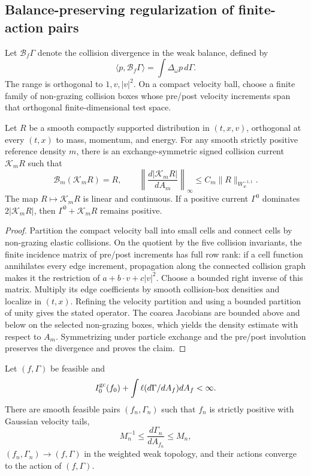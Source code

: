 \subsection{Balance-preserving regularization of finite-action pairs}

Let \(\mathscr B_f\Gamma\) denote the collision divergence in the weak
balance, defined by
\[
 \langle p,\mathscr B_f\Gamma\rangle
 =\int\Delta_\omega p\,d\Gamma.
\]
The range is orthogonal to \(1,v,|v|^2\).  On a compact velocity ball, choose
a finite family of non-grazing collision boxes whose pre/post velocity
increments span that orthogonal finite-dimensional test space.

\begin{lemma}
\label{lem:r3-b2-right-inverse}
Let \(R\) be a smooth compactly supported distribution in
\((t,x,v)\), orthogonal at every \((t,x)\) to mass, momentum, and energy.  For
any smooth strictly positive reference density \(m\), there is an
exchange-symmetric signed collision current \(\mathscr K_mR\) such that
\[
 \mathscr B_m(\mathscr K_mR)=R,
 \qquad
 \left\|\frac{d|\mathscr K_mR|}{dA_m}\right\|_\infty
 \le C_m\|R\|_{W^{-1,1}_w}.
\]
The map \(R\mapsto\mathscr K_mR\) is linear and continuous.  If a positive
current \(\Gamma^0\) dominates
\(2|\mathscr K_mR|\), then
\(\Gamma^0+\mathscr K_mR\) remains positive.
\end{lemma}

\begin{proof}
Partition the compact velocity ball into small cells and connect cells by
non-grazing elastic collisions.  On the quotient by the five collision
invariants, the finite incidence matrix of pre/post increments has full row
rank: if a cell function annihilates every edge increment, propagation along
the connected collision graph makes it the restriction of
\(a+b\cdot v+c|v|^2\).  Choose a bounded right inverse of this matrix.
Multiply its edge coefficients by smooth collision-box densities and localize
in \((t,x)\).  Refining the velocity partition and using a bounded partition
of unity gives the stated operator.  The coarea Jacobians are bounded above
and below on the selected non-grazing boxes, which yields the density estimate
with respect to \(A_m\).  Symmetrizing under particle exchange and the
pre/post involution preserves the divergence and proves the claim.
\end{proof}

\begin{lemma}
\label{lem:r3-b2-regularization}
Let \((f,\Gamma)\) be feasible and
\[
 I_0^{\rm gc}(f_0)+
 \int\ell(d\Gamma/dA_f)dA_f<\infty.
\]
There are smooth feasible pairs \((f_n,\Gamma_n)\) such that
\(f_n\) is strictly positive with Gaussian velocity tails,
\[
 M_n^{-1}\le\frac{d\Gamma_n}{dA_{f_n}}\le M_n,
\]
\((f_n,\Gamma_n)\to(f,\Gamma)\) in the weighted weak topology, and their
actions converge to the action of \((f,\Gamma)\).
\end{lemma}

